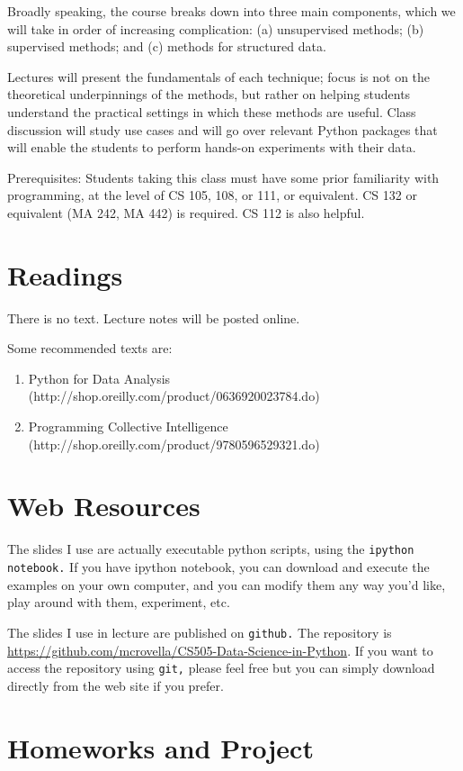 \documentclass[11pt]{article}
\begin{document}
Broadly speaking, the course breaks down into three main components,
which we will take in order of increasing complication:  (a)
unsupervised methods; (b) supervised methods; and (c) methods for
structured data.

Lectures will present the fundamentals of each technique; focus is not
on the theoretical underpinnings of the methods, but rather on helping
students understand the practical settings in which these methods are
useful.  Class discussion will study use cases and will go over relevant
Python packages that will enable the students to perform hands-on
experiments with their data. 

Prerequisites: Students taking this class must have some prior familiarity with
programming, at the level of CS 105, 108, or 111, or equivalent.   CS
132 or equivalent (MA 242, MA 442) is required.  CS 112 is also helpful.

\section*{Readings} 

There is no text.   Lecture notes will be posted online.

Some recommended texts are:
\begin{enumerate}
\item Python for Data Analysis
  (http://shop.oreilly.com/product/0636920023784.do)
\item Programming Collective Intelligence (http://shop.oreilly.com/product/9780596529321.do)
\end{enumerate}

\section*{Web Resources} 

The slides I use are actually executable python scripts, using the
\texttt{ipython notebook.}   If you have ipython notebook, you can
download and execute the examples on your own computer, and you can
modify them any way you'd like, play around with them, experiment, etc.

The slides I use in lecture are published on \texttt{github.}   The
repository is
\url{https://github.com/mcrovella/CS505-Data-Science-in-Python}.  If you want
to access the repository using \texttt{git,} please feel free but you
can simply download directly from the web site if you prefer.
 
\section*{Homeworks and Project}
\end{document}
